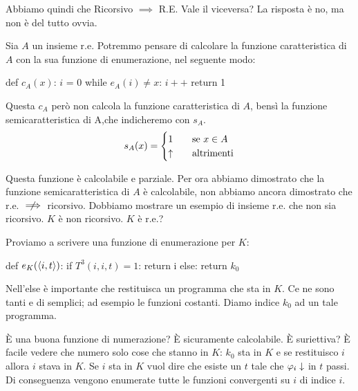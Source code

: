 
Abbiamo quindi che Ricorsivo $\implies$ R.E. Vale il viceversa? La risposta è no, ma non è del tutto
ovvia.

Sia $A$ un insieme r.e. Potremmo pensare di calcolare la funzione caratteristica di $A$ con la sua
funzione di enumerazione, nel seguente modo:
\begin{python}
    def $c_{A}(x)$:
        $i$ = 0
        while $e_{A}(i) \not= x$:
            $i++$ 
        return 1
\end{python}

Questa $c_{A}$ però non calcola la funzione caratteristica di $A$, bensì la funzione
semicaratteristica di A,che indicheremo con $s_{A}$.
\begin{equation*}
    s_{A}(x) =
    \begin{cases}
        1 \quad &\text{se $x \in A$} \\
        \uparrow \quad &\text{altrimenti}
    \end{cases}
\end{equation*}

Questa funzione è calcolabile e parziale. Per ora abbiamo dimostrato che la funzione
semicaratteristica di $A$ è calcolabile, non abbiamo ancora dimostrato che r.e. $\centernot\implies$
ricorsivo. Dobbiamo mostrare un esempio di insieme r.e. che non sia ricorsivo. $K$ è non
ricorsivo. $K$ è r.e.?

Proviamo a scrivere una funzione di enumerazione per $K$:
\begin{python}
    def $e_{K}(\langle i, t \rangle)$:
        if $T^{3}(i,i,t) = 1$:
            return i
        else:
            return $k_{0}$
\end{python}
        
Nell'else è importante che restituisca un programma che sta in $K$. Ce ne sono tanti e di semplici;
ad esempio le funzioni costanti. Diamo indice $k_{0}$ ad un tale programma.

È una buona funzione di numerazione? È sicuramente calcolabile. È suriettiva? È facile vedere che
numero solo cose che stanno in $K$: $k_{0}$ sta in $K$ e se restituisco $i$ allora $i$ stava in $K$.
Se $i$ sta in $K$ vuol dire che esiste un $t$ tale che $\varphi_{i} \downarrow$ in $t$ passi. Di conseguenza
vengono enumerate tutte le funzioni convergenti su $i$ di indice $i$. 

